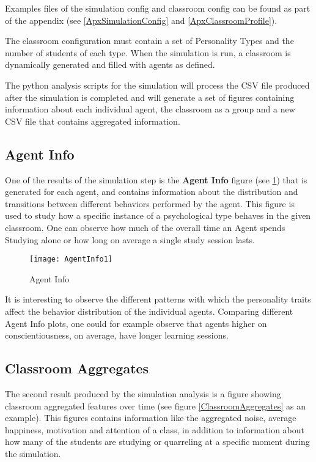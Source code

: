 Examples files of the simulation config and classroom config can be found as part of
the appendix (see \ref{ApxSimulationConfig} and \ref{ApxClassroomProfile}).

The classroom configuration must contain a set of Personality Types and the number
of students of each type. When the simulation is run, a classroom is dynamically
generated and filled with agents as defined.

The python analysis scripts for the simulation will process the CSV file produced
after the simulation is completed and will generate a set of figures containing information
about each individual agent, the classroom as a group and a new CSV file that contains
aggregated information.

\subsection{Agent Info}
One of the results of the simulation step is the \textbf{Agent Info} figure
(see \ref{AgentInfo}) that is generated for each agent, and contains information
about the distribution and transitions between different behaviors performed by the agent.
This figure is used to study how a specific instance of a psychological type behaves
in the given classroom. One can observe how much of the overall time an Agent
spends Studying alone or how long on average a single study session lasts.

\begin{figure}[H]
    \centering
    \texttt{[image: AgentInfo1]}
    \caption{Agent Info}
    \label{AgentInfo}
\end{figure}

It is interesting to observe the different patterns with which the personality traits
affect the behavior distribution of the individual agents. Comparing different
Agent Info plots, one could for example observe that agents higher on conscientiousness,
on average, have longer learning sessions.

\subsection{Classroom Aggregates}
The second result produced by the simulation analysis is a figure showing classroom
aggregated features over time (see figure \ref{ClassroomAggregates} as an example).
This figures contains information like the aggregated noise, average happiness,
motivation and attention of a class, in addition to information about how many of
the students are studying or quarreling at a specific moment during the simulation.

